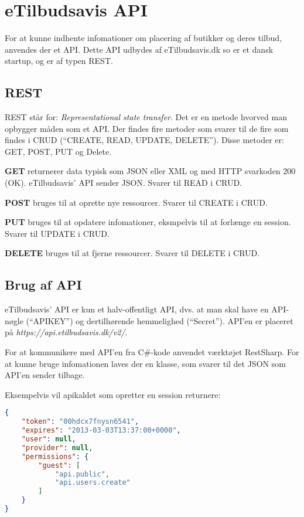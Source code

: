 \chapter{eTilbudsavis API}
For at kunne indhente infomationer om placering af butikker og deres tilbud, anvendes der et API.
Dette API udbydes af eTilbudsavis.dk so er et dansk startup, og er af typen REST.

\section{REST}
REST står for: \textit{Representational state transfer}.
Det er en metode hvorved man opbygger måden som et API. 
Der findes fire metoder som svarer til de fire som findes i CRUD (``CREATE, READ, UPDATE, DELETE'').
Disse metoder er: GET, POST, PUT og Delete.

\textbf{GET}
returnerer data typisk som JSON eller XML og med HTTP svarkoden 200 (OK). 
eTilbudsavis' API sender JSON. 
Svarer til READ i CRUD.

\textbf{POST}
bruges til at oprette nye ressourcer.
Svarer til CREATE i CRUD.

\textbf{PUT}
bruges til at opdatere infomationer, eksmpelvis til at forlænge en session.
Svarer til UPDATE i CRUD.

\textbf{DELETE}
bruges til at fjerne ressourcer. 
Svarer til DELETE i CRUD.

\section{Brug af API}
eTilbudsavis' API er kun et halv-offentligt API, dvs. at man skal have en API-nøgle (``APIKEY'') og dertilhørende hemmelighed (``Secret'').
API'en er placeret på \textit{https://api.etilbudsavis.dk/v2/}. \citep{eTilAPI}

For at kommunikere med API'en fra C\#-kode anvendet værktøjet RestSharp. \citep{RestSharp} 
For at kunne bruge infomationen laves der en klasse, som svarer til det JSON som API'en sender tilbage.

Eksempelvis vil apikaldet som opretter en session returnere:

\begin{lstlisting}[language=json,firstnumber=1,caption="POST til sessions api'en med APIKEYen"]
{
    "token": "00hdcx7fnysn6541",
    "expires": "2013-03-03T13:37:00+0000",
    "user": null,
    "provider": null,
    "permissions": {
        "guest": [
            "api.public",
            "api.users.create"
        ]
    }
}
\end{lstlisting}

